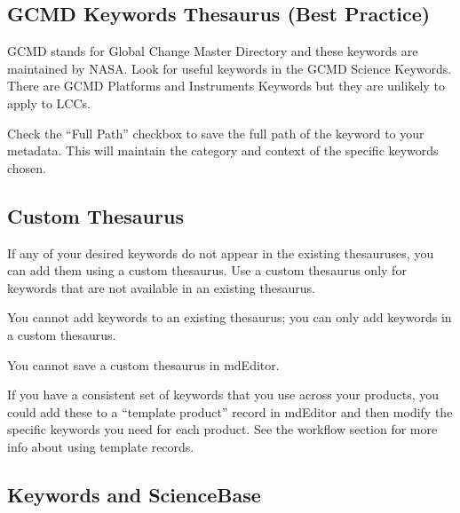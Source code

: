 \documentclass[
]{book}
\makeatletter
\newenvironment{kframe}{%
\medskip{}
\setlength{\fboxsep}{.8em}
 \def\at@end@of@kframe{}%
 \ifinner\ifhmode%
  \def\at@end@of@kframe{\end{minipage}}%
  \begin{minipage}{\columnwidth}%
 \fi\fi%
 \def\FrameCommand##1{\hskip\@totalleftmargin \hskip-\fboxsep
 \colorbox{shadecolor}{##1}\hskip-\fboxsep
     \hskip-\linewidth \hskip-\@totalleftmargin \hskip\columnwidth}%
 \MakeFramed {\advance\hsize-\width
   \@totalleftmargin\z@ \linewidth\hsize
   \@setminipage}}%
 {\par\unskip\endMakeFramed%
 \at@end@of@kframe}
\newenvironment{rmdblock}[1]
  {
  \begin{itemize}
  \renewcommand{\labelitemi}{
    \raisebox{-.7\height}[0pt][0pt]{
      {\setkeys{Gin}{width=3em,keepaspectratio}\texttt{[image: images/\#1]}}
    }
  }
  \setlength{\fboxsep}{1em}
  \begin{kframe}
  \item
  }
  {
  \end{kframe}
  \end{itemize}
  }
\newenvironment{rmdtip}
  {\begin{rmdblock}{tip}}
  {\end{rmdblock}}
\makeatother
\begin{document}
\hypertarget{gcmd-keywords-thesaurus-best-practice-1}{%
\subsection*{GCMD Keywords Thesaurus (Best Practice)}\label{gcmd-keywords-thesaurus-best-practice-1}}

GCMD stands for Global Change Master Directory and these keywords are maintained by NASA. Look for useful keywords in the GCMD Science Keywords. There are GCMD Platforms and Instruments Keywords but they are unlikely to apply to LCCs.

\begin{rmdtip}
Check the ``Full Path'' checkbox to save the full path of the keyword to
your metadata. This will maintain the category and context of the
specific keywords chosen.
\end{rmdtip}

\hypertarget{custom-thesaurus-1}{%
\subsection*{Custom Thesaurus}\label{custom-thesaurus-1}}

If any of your desired keywords do not appear in the existing thesauruses, you can add them using a custom thesaurus. Use a custom thesaurus only for keywords that are not available in an existing thesaurus.

You cannot add keywords to an existing thesaurus; you can only add keywords in a custom thesaurus.

You cannot save a custom thesaurus in mdEditor.

\begin{rmdtip}
If you have a consistent set of keywords that you use across your
products, you could add these to a ``template product'' record in
mdEditor and then modify the specific keywords you need for each
product. See the workflow section for more info about using template
records.
\end{rmdtip}

\hypertarget{keywords-and-sciencebase-1}{%
\subsection*{Keywords and ScienceBase}\label{keywords-and-sciencebase-1}}
\end{document}
